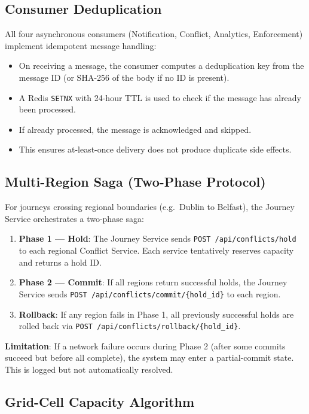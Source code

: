 \documentclass[12pt,a4paper]{article}
\begin{document}
\subsection{Consumer Deduplication}

All four asynchronous consumers (Notification, Conflict, Analytics, Enforcement) implement idempotent message handling:
\begin{itemize}[nosep]
  \item On receiving a message, the consumer computes a deduplication key from the message ID (or SHA-256 of the body if no ID is present).
  \item A Redis \texttt{SETNX} with 24-hour TTL is used to check if the message has already been processed.
  \item If already processed, the message is acknowledged and skipped.
  \item This ensures at-least-once delivery does not produce duplicate side effects.
\end{itemize}

\subsection{Multi-Region Saga (Two-Phase Protocol)}

For journeys crossing regional boundaries (e.g.\ Dublin to Belfast), the Journey Service orchestrates a two-phase saga:

\begin{enumerate}[nosep]
  \item \textbf{Phase 1 --- Hold}: The Journey Service sends \texttt{POST /api/conflicts/hold} to each regional Conflict Service. Each service tentatively reserves capacity and returns a hold ID.
  \item \textbf{Phase 2 --- Commit}: If all regions return successful holds, the Journey Service sends \texttt{POST /api/conflicts/commit/\{hold\_id\}} to each region.
  \item \textbf{Rollback}: If any region fails in Phase 1, all previously successful holds are rolled back via \texttt{POST /api/conflicts/rollback/\{hold\_id\}}.
\end{enumerate}

\textbf{Limitation}: If a network failure occurs during Phase 2 (after some commits succeed but before all complete), the system may enter a partial-commit state. This is logged but not automatically resolved.

\subsection{Grid-Cell Capacity Algorithm}
\end{document}
